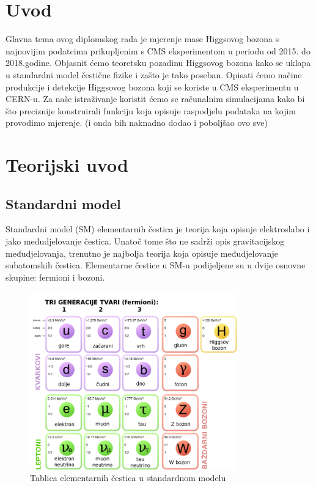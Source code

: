 \documentclass[12pt,a4paper,oneside]{article}
\begin{document}
	\naslovnica %
	\zahvale %
	\tdkHR \tdkEN %
	\tableofcontents %
	\pocetak %
	
	
	\begin{linenumbers}
		\section{Uvod}
		Glavna tema ovog diplomskog rada je mjerenje mase Higgsovog bozona s najnovijim podatcima prikupljenim s CMS eksperimentom u periodu od 2015. do 2018.godine. Objasnit ćemo teoretsku pozadinu Higgsovog bozona kako se uklapa u standardni model čestične fizike i zašto je tako poseban. Opisati ćemo načine produkcije i detekcije Higgsovog bozona koji se koriste u CMS eksperimentu u CERN-u. Za naše istraživanje koristit ćemo se računalnim simulacijama kako bi što preciznije konstruirali funkciju koja opisuje raspodjelu podataka na kojim provodimo mjerenje.
		(i onda bih naknadno dodao i poboljšao ovo sve)
		
		\section{Teorijski uvod}
		
		\subsection{Standardni model}
		
		Standardni model (SM) elementarnih čestica je teorija koja opisuje elektroslabo i jako međudjelovanje čestica. Unatoč tome što ne sadrži opis gravitacijskog međudjelovanja, trenutno je najbolja teorija koja opisuje međudjelovanje subatomskih čestica.
		Elementarne čestice u SM-u podijeljene su u dvije osnovne skupine: fermioni i bozoni.
		\begin{figure}[h!]
			\centering
			\includegraphics[width=0.8\textwidth]{Standard_Model_of_Elementary_Particles_hr.png}
			\caption[SM]{\label{sl:primjer}Tablica elementarnih čestica u standardnom modelu}
		\end{figure}
		

\end{linenumbers}
\end{document}
